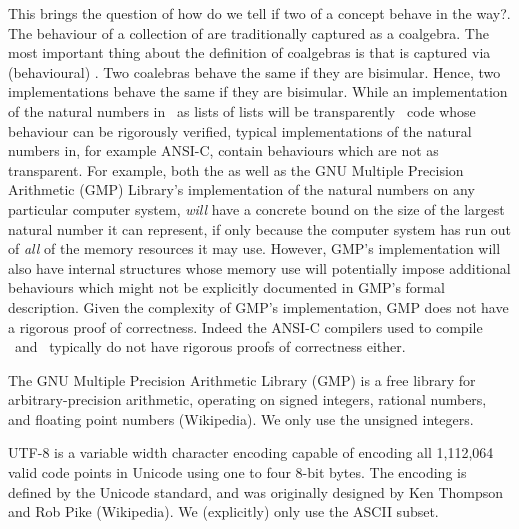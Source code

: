 This brings the question of how do we tell if two  
of a concept behave in the  way?. The behaviour of a 
collection of  are traditionally captured as a coalgebra. 
The most important thing about the definition of coalgebras is that 
 is captured via (behavioural) . Two 
coalebras behave the same if they are bisimular. Hence, two 
implementations behave the same if they are bisimular. While an 
implementation of the natural numbers in \joylolZero\ as lists of lists 
will be transparently \joylolZero\ code whose behaviour can be rigorously 
verified, typical implementations of the natural numbers in, for example 
ANSI-C, contain behaviours which are not as transparent. For example, both 
the \joylolZero as well as the GNU Multiple Precision Arithmetic (GMP) 
Library's implementation of the natural numbers on any particular computer 
system, \emph{will} have a concrete bound on the size of the largest 
natural number it can represent, if only because the computer system has 
run out of \emph{all} of the memory resources it may use. However, GMP's 
implementation will also have internal structures whose memory use will 
potentially impose additional behaviours which might not be explicitly 
documented in GMP's formal description. Given the complexity of GMP's 
implementation, GMP does not have a rigorous proof of correctness. Indeed 
the ANSI-C compilers used to compile \joylolZero\ and \joylol\ typically 
do not have rigorous proofs of correctness either. 



The GNU Multiple Precision Arithmetic Library (GMP) is a free library for 
arbitrary-precision arithmetic, operating on signed integers, rational 
numbers, and floating point numbers (Wikipedia). We only use the unsigned 
integers. 

UTF-8 is a variable width character encoding capable of encoding all 
1,112,064 valid code points in Unicode using one to four 8-bit bytes. The 
encoding is defined by the Unicode standard, and was originally designed 
by Ken Thompson and Rob Pike (Wikipedia). We (explicitly) only use the 
ASCII subset. 

